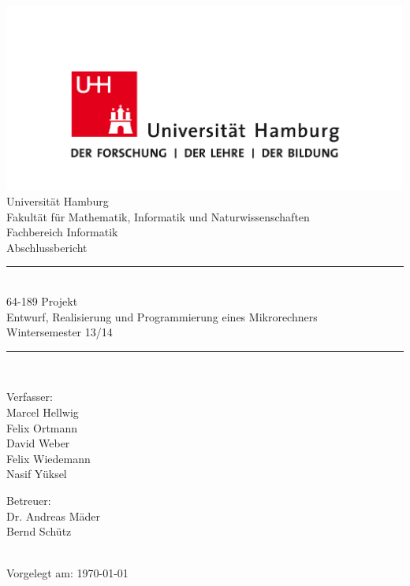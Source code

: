 


\begin{fullsizetitle}
\centering
\begin{minipage}{0.75\textwidth}
\vspace*{5em}
\begin{center}
\includegraphics[width=\textwidth]{images/uhh.png}\\
\vspace*{4em}
{\LARGE Universität Hamburg}\\[.25em]
{\Large Fakultät für Mathematik, Informatik und Naturwissenschaften}\\
{\Large Fachbereich Informatik}\\[3em]
{\Huge Abschlussbericht}\\[3em]

\newcommand{\HRule}{\rule{\linewidth}{0.5mm}}
\HRule\\[.4em]
{\Large%
64-189 Projekt\\%
Entwurf, Realisierung und Programmierung eines Mikrorechners\\%
Wintersemester 13/14\\%
}
\HRule\\[3em]

\begin{minipage}[t]{0.4\textwidth}
\begin{flushleft} \large
Verfasser:\\[1em]%
Marcel Hellwig\\%
Felix Ortmann\\%
David Weber\\%
Felix Wiedemann\\%
Nasif Yüksel%
\end{flushleft}
\end{minipage}
\hfill
\begin{minipage}[t]{0.4\textwidth}
\begin{flushright} \large
Betreuer:\\[1em]
Dr. Andreas Mäder\\%
Bernd Schütz%
\end{flushright}
\end{minipage} \\[12em]

{\large Vorgelegt am: \today}
\end{center}
\end{minipage}
\end{fullsizetitle}

